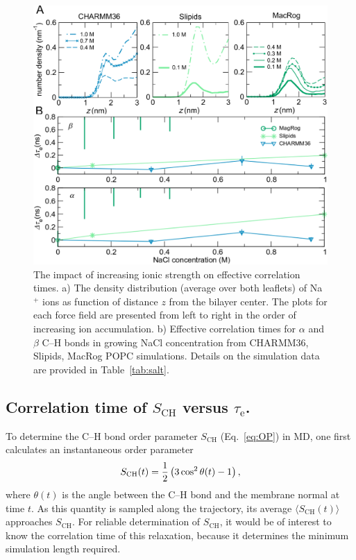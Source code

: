 \documentclass[journal=jpcbfk,manuscript=article,layout=twocolumn]{achemso}
\begin{document}

\begin{figure}[ht!]
\centering
\includegraphics[scale=0.36]{./figures/salt.pdf} 
\caption{The impact of increasing ionic strength on effective correlation times. a) The density distribution (average over both leaflets) of Na$^{+}$ ions as function of distance $z$ from the bilayer center. The plots for each force field are presented from left to right in the order of increasing ion accumulation. b) Effective correlation times for $\alpha$ and $\beta$ C--H bonds in growing NaCl concentration from CHARMM36, Slipids, MacRog POPC simulations. Details on the simulation data are provided in Table~\ref{tab:salt}.}
\label{fig:salt}
\end{figure}

\subsection*{Correlation time of $S_\mathrm{CH}$ versus $\tau_\mathrm e$.}
To determine the C--H bond order parameter $S_\mathrm{CH}$ (Eq.~\eqref{eq:OP})
in MD, one first calculates an instantaneous order parameter
\begin{equation}
\label{eq:instantaneousOP}
S_{\rm{CH}}(t)=\frac{1}{2}\left( 3\cos^{2}\theta(t)-1 \right),
\end{equation}
where $\theta(t)$ is the angle between the C--H bond and the membrane normal at time $t$.
As this quantity is sampled along the trajectory, its average
$\langle S_\mathrm{CH}(t) \rangle$
approaches $S_\mathrm{CH}$.
For reliable determination of $S_\mathrm{CH}$,
it would be of interest to know the correlation time of this relaxation,
because it determines the minimum simulation length required.
\end{document}
